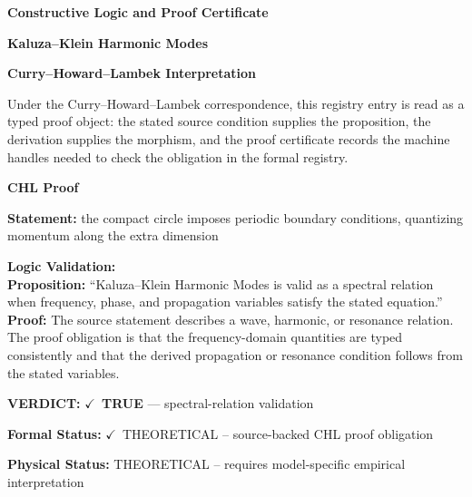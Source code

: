 \clearpage
\begingroup\tzpsupportsetup
\noindent\textbf{\fontsize{10.8pt}{12.8pt}\selectfont [ID 0205] Constructive Logic and Proof Certificate}\par
\noindent\textbf{\fontsize{10pt}{12pt}\selectfont Kaluza--Klein Harmonic Modes}\par
\vspace{0.45em}
\begingroup
\footnotesize
\setlength{\parskip}{0.22em}
\setlength{\parindent}{0pt}
\noindent\textbf{Curry--Howard--Lambek Interpretation}\par
Under the Curry--Howard--Lambek correspondence, this registry entry is read as a typed proof
object: the stated source condition supplies the proposition, the derivation supplies the
morphism, and the proof certificate records the machine handles needed to check the obligation
in the formal registry.

\vspace{0.45em}
\noindent\textbf{CHL Proof}\par
\textbf{Statement:} the compact circle imposes periodic boundary conditions, quantizing momentum along the
extra dimension

\textbf{Logic Validation:}\\
\textbf{Proposition:} ``Kaluza--Klein Harmonic Modes is valid as a spectral relation when frequency, phase, and
propagation variables satisfy the stated equation.''\\
\textbf{Proof:} The source statement describes a wave, harmonic, or resonance relation. The proof
obligation is that the frequency-domain quantities are typed consistently and that the
derived propagation or resonance condition follows from the stated variables.

\textbf{VERDICT:} \ensuremath{\checkmark}\ \textbf{TRUE} --- spectral-relation validation

\textbf{Formal Status:} \ensuremath{\checkmark}\ THEORETICAL -- source-backed CHL proof obligation

\textbf{Physical Status:} THEORETICAL -- requires model-specific empirical interpretation
\par\vspace{0.45em}
\par
\ifTZPDarkEdition
{}
\fi
\endgroup
\endgroup

